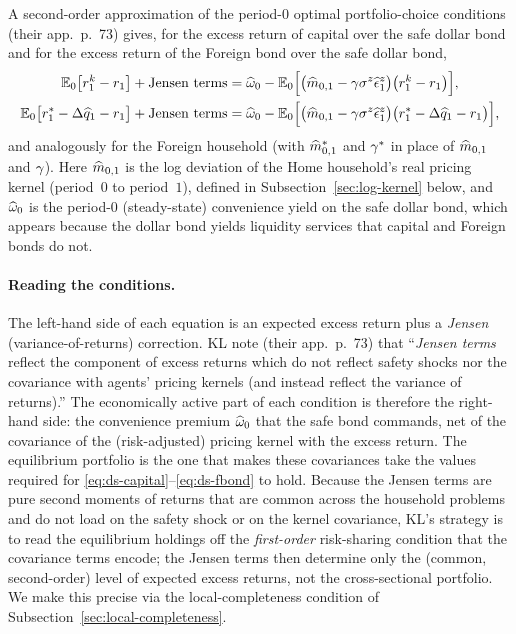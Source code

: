 A second-order approximation of the period-$0$ optimal portfolio-choice
conditions (their app.~p.~73) gives, for the excess return of capital over the
safe dollar bond and for the excess return of the Foreign bond over the safe
dollar bond,
\begin{align}
\mathbb{E}_0\bigl[r^{k}_1-r_1\bigr] + \text{Jensen terms}
&= \widehat{\omega}_0 - \mathbb{E}_0\Bigl[\bigl(\widehat{m}_{0,1}-\gamma\sigma^z\widehat{\epsilon}^z_1\bigr)\bigl(r^{k}_1-r_1\bigr)\Bigr], \label{eq:ds-capital}\\
\mathbb{E}_0\bigl[r^{*}_1-\Delta\widehat{q}_1-r_1\bigr] + \text{Jensen terms}
&= \widehat{\omega}_0 - \mathbb{E}_0\Bigl[\bigl(\widehat{m}_{0,1}-\gamma\sigma^z\widehat{\epsilon}^z_1\bigr)\bigl(r^{*}_1-\Delta\widehat{q}_1-r_1\bigr)\Bigr], \label{eq:ds-fbond}
\end{align}
and analogously for the Foreign household (with $\widehat{m}^{*}_{0,1}$ and
$\gamma^{*}$ in place of $\widehat{m}_{0,1}$ and $\gamma$). Here $\widehat{m}_{0,1}$ is the
log deviation of the Home household's real pricing kernel (period~$0$ to
period~$1$), defined in Subsection~\ref{sec:log-kernel} below, and
$\widehat{\omega}_0$ is the period-$0$ (steady-state) convenience yield on the safe
dollar bond, which appears because the dollar bond yields liquidity services that
capital and Foreign bonds do not.

\paragraph{Reading the conditions.} The left-hand side of each equation is an
expected excess return plus a \emph{Jensen} (variance-of-returns) correction. KL
note (their app.~p.~73) that ``\emph{Jensen terms} reflect the component of
excess returns which do not reflect safety shocks nor the covariance with agents'
pricing kernels (and instead reflect the variance of returns).'' The
economically active part of each condition is therefore the right-hand side: the
convenience premium $\widehat{\omega}_0$ that the safe bond commands, net of the
covariance of the (risk-adjusted) pricing kernel with the excess return. The
equilibrium portfolio is the one that makes these covariances take the values
required for \eqref{eq:ds-capital}--\eqref{eq:ds-fbond} to hold. Because the
Jensen terms are pure second moments of returns that are common across the
household problems and do not load on the safety shock or on the kernel
covariance, KL's strategy is to read the equilibrium holdings off the
\emph{first-order} risk-sharing condition that the covariance terms encode; the
Jensen terms then determine only the (common, second-order) level of expected
excess returns, not the cross-sectional portfolio. We make this precise via the
local-completeness condition of Subsection~\ref{sec:local-completeness}.


